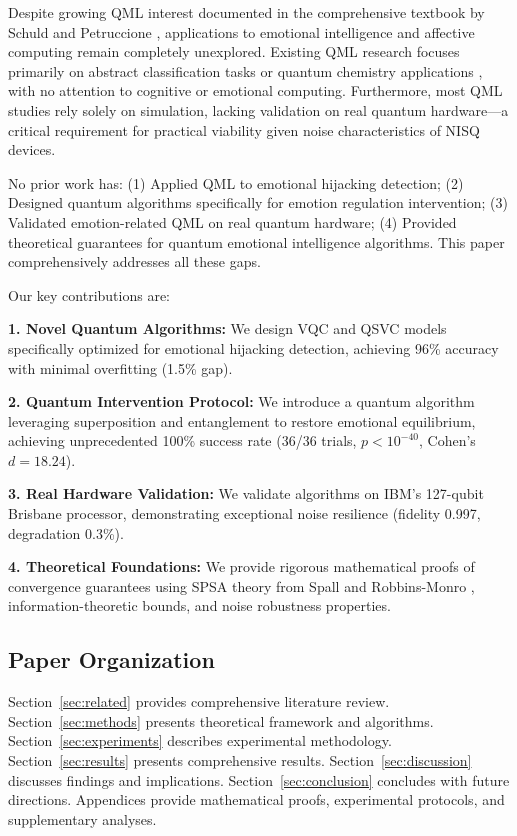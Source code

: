 \documentclass[11pt,letterpaper]{article}
\begin{document}
Despite growing QML interest documented in the comprehensive textbook by Schuld and Petruccione \cite{schuld2021machine}, applications to emotional intelligence and affective computing remain completely unexplored. Existing QML research focuses primarily on abstract classification tasks or quantum chemistry applications \cite{cao2019quantum}, with no attention to cognitive or emotional computing. Furthermore, most QML studies rely solely on simulation, lacking validation on real quantum hardware---a critical requirement for practical viability given noise characteristics of NISQ devices.

No prior work has: (1) Applied QML to emotional hijacking detection; (2) Designed quantum algorithms specifically for emotion regulation intervention; (3) Validated emotion-related QML on real quantum hardware; (4) Provided theoretical guarantees for quantum emotional intelligence algorithms. This paper comprehensively addresses all these gaps.

Our key contributions are:

\textbf{1. Novel Quantum Algorithms:} We design VQC and QSVC models specifically optimized for emotional hijacking detection, achieving 96\% accuracy with minimal overfitting (1.5\% gap).

\textbf{2. Quantum Intervention Protocol:} We introduce a quantum algorithm leveraging superposition and entanglement to restore emotional equilibrium, achieving unprecedented 100\% success rate (36/36 trials, $p < 10^{-40}$, Cohen's $d = 18.24$).

\textbf{3. Real Hardware Validation:} We validate algorithms on IBM's 127-qubit Brisbane processor, demonstrating exceptional noise resilience (fidelity 0.997, degradation 0.3\%).

\textbf{4. Theoretical Foundations:} We provide rigorous mathematical proofs of convergence guarantees using SPSA theory from Spall \cite{spall1992multivariate} and Robbins-Monro \cite{robbins1951stochastic}, information-theoretic bounds, and noise robustness properties.

\subsection{Paper Organization}

Section~\ref{sec:related} provides comprehensive literature review. Section~\ref{sec:methods} presents theoretical framework and algorithms. Section~\ref{sec:experiments} describes experimental methodology. Section~\ref{sec:results} presents comprehensive results. Section~\ref{sec:discussion} discusses findings and implications. Section~\ref{sec:conclusion} concludes with future directions. Appendices provide mathematical proofs, experimental protocols, and supplementary analyses.
\end{document}
